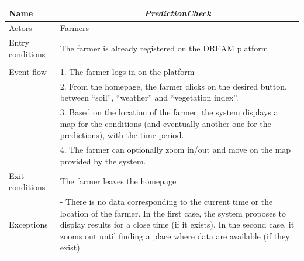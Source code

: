 \begin{table}[H]
	\centering
	\begin{tabularx}{\linewidth}{|l|X|}
		\hline
		Name & \multicolumn{1}{c|}{\textit{\textbf{PredictionCheck}}}                                                   \tabularnewline \hline
		Actors                                               & Farmers                                                    \tabularnewline \hline
		Entry conditions                                              &
		The farmer is already registered on the DREAM platform
		\tabularnewline
		&
		\tabularnewline \hline
		Event flow                                         & 1.	The farmer logs in on the platform                                         \tabularnewline 
		& 2.	From the homepage, the farmer clicks on the desired button, between “soil”, “weather” and “vegetation index”.                                          \tabularnewline 
		& 3.	Based on the location of the farmer, the system displays a map for the conditions (and eventually another one for the predictions), with the time period.                                           \tabularnewline 
		& 4.	The farmer can optionally zoom in/out and move on the map provided by the system.                                    \tabularnewline \hline
		Exit conditions 
		& The farmer leaves the homepage
		\tabularnewline \hline
		Exceptions 
		& -	There is no data corresponding to the current time or the location of the farmer. In the first case, the system proposes to display results for a close time (if it exists). In the second case, it zooms out until finding a place where data are available (if they exist)
		\tabularnewline
		\hline
	\end{tabularx}   
\end{table}

